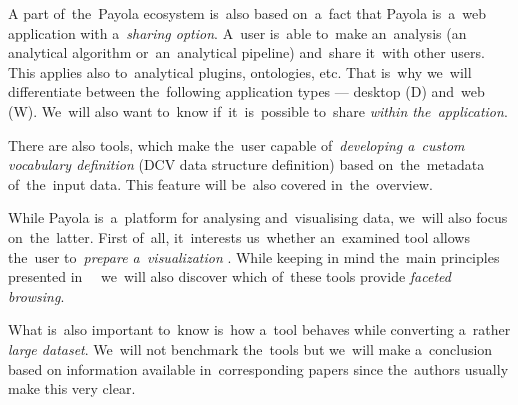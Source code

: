 A part of~the~Payola ecosystem is~also based on~a~fact that Payola is~a~web 
application with a~\emph{sharing option}. A~user is~able to~make an~analysis (an
analytical algorithm or~an~analytical pipeline) and~share it~with other users. This applies also to~analytical plugins, ontologies, etc. That is~why we~will differentiate between the~following
application types --- desktop (D) and~web (W). We~will also want to~know if~it~is~possible to~share \emph{within the~application}.

There are also tools, which make the~user capable of~\emph{developing a~custom vocabulary 
definition} (DCV data structure definition) based on~the~metadata of~the~input data.
This feature will be~also covered in~the~overview.

While Payola is~a~platform for analysing and~visualising data, we~will also 
focus on~the~latter. First of~all, it~interests us~whether 
an~examined tool allows the~user to~\emph{prepare a~visualization} . While keeping 
in mind the~main principles presented in~~\cite{mantra} we~will also discover 
which of~these tools provide \emph{faceted browsing}.

What is~also important to~know is~how a~tool behaves while converting a~rather 
\emph{large dataset}. We~will not benchmark the~tools but we~will make a~conclusion based 
on information available in~corresponding papers since the~authors usually make 
this very clear.

